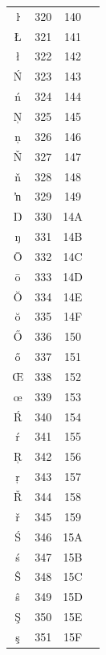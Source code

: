 ﻿\documentclass[10pt]{article}
\begin{document}
\begin{tabular}{crcl}
ŀ&320&140&\\
Ł&321&141&\\
ł&322&142&\\
Ń&323&143&\\
ń&324&144&\\
Ņ&325&145&\\
ņ&326&146&\\
Ň&327&147&\\
ň&328&148&\\
ŉ&329&149&\\
Ŋ&330&14A&\\
ŋ&331&14B&\\
Ō&332&14C&\\
ō&333&14D&\\
Ŏ&334&14E&\\
ŏ&335&14F&\\
Ő&336&150&\\
ő&337&151&\\
Œ&338&152&\\
œ&339&153&\\
Ŕ&340&154&\\
ŕ&341&155&\\
Ŗ&342&156&\\
ŗ&343&157&\\
Ř&344&158&\\
ř&345&159&\\
Ś&346&15A&\\
ś&347&15B&\\
Ŝ&348&15C&\\
ŝ&349&15D&\\
Ş&350&15E&\\
ş&351&15F&\\
\end{tabular}
\end{document}

